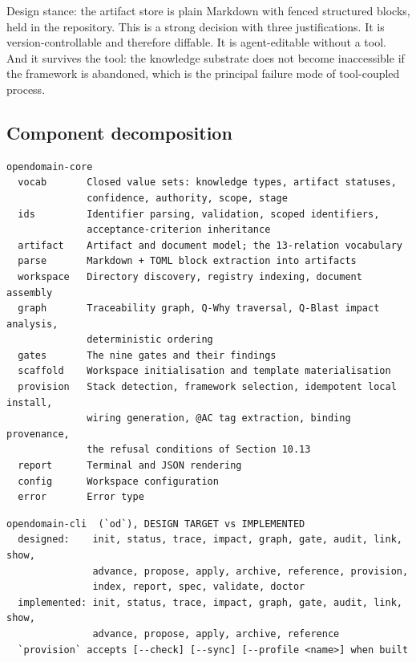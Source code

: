 \documentclass[11pt,a4paper]{article}
\begin{document}
Design stance: the artifact store is plain Markdown with fenced structured blocks, held in the repository. This is a strong decision with three justifications. It is version-controllable and therefore diffable. It is agent-editable without a tool. And it survives the tool: the knowledge substrate does not become inaccessible if the framework is abandoned, which is the principal failure mode of tool-coupled process.

\subsection{Component decomposition}

\begin{Verbatim}[fontsize=\footnotesize,breaklines=true,breakanywhere=true,breakautoindent=false,samepage=false]
opendomain-core
  vocab       Closed value sets: knowledge types, artifact statuses,
              confidence, authority, scope, stage
  ids         Identifier parsing, validation, scoped identifiers,
              acceptance-criterion inheritance
  artifact    Artifact and document model; the 13-relation vocabulary
  parse       Markdown + TOML block extraction into artifacts
  workspace   Directory discovery, registry indexing, document assembly
  graph       Traceability graph, Q-Why traversal, Q-Blast impact analysis,
              deterministic ordering
  gates       The nine gates and their findings
  scaffold    Workspace initialisation and template materialisation
  provision   Stack detection, framework selection, idempotent local install,
              wiring generation, @AC tag extraction, binding provenance,
              the refusal conditions of Section 10.13
  report      Terminal and JSON rendering
  config      Workspace configuration
  error       Error type
\end{Verbatim}

\begin{Verbatim}[fontsize=\footnotesize,breaklines=true,breakanywhere=true,breakautoindent=false,samepage=false]
opendomain-cli  (`od`), DESIGN TARGET vs IMPLEMENTED
  designed:    init, status, trace, impact, graph, gate, audit, link, show,
               advance, propose, apply, archive, reference, provision,
               index, report, spec, validate, doctor
  implemented: init, status, trace, impact, graph, gate, audit, link, show,
               advance, propose, apply, archive, reference
  `provision` accepts [--check] [--sync] [--profile <name>] when built
\end{Verbatim}
\end{document}
